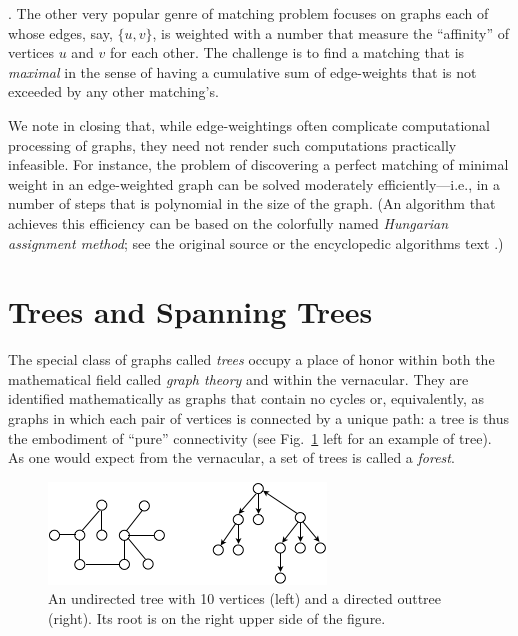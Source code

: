 \bigskip

.
The other very popular genre of matching problem focuses on graphs
each of whose edges, say, $\{u,v\}$, is weighted with a number that
measure the ``affinity'' of  vertices $u$ and $v$ for each other.  The
challenge is to find a matching that is {\em maximal}
 in the sense of having a cumulative
sum of edge-weights that is not exceeded by any other matching's.

We note in closing that, while edge-weightings often complicate
computational processing of graphs, they need not render such
computations practically infeasible.  For instance, the problem of
discovering a perfect matching of minimal weight in an edge-weighted
graph can be solved moderately efficiently---i.e., in a number of
steps that is polynomial in the size of the graph.  (An algorithm that
achieves this efficiency can be based on the colorfully named {\it
  Hungarian assignment method};   see the
original source \cite{Kuhn55} or the encyclopedic algorithms text
\cite{CLRS}.)



\section{Trees and Spanning Trees}
\label{sec:Trees}

The special class of graphs called {\it trees} occupy a place of honor within both the mathematical
field called {\it graph theory} and within the vernacular.  They are identified mathematically as graphs 
that contain no cycles or, equivalently, as graphs in which each pair of vertices is
connected by a unique path: a tree is thus the embodiment of ``pure''
connectivity (see Fig.~\ref{fig:tree} left for an example of tree).  As one
would expect from the vernacular, a set of trees is called a {\it forest}. 
\begin{figure}[hbt]
\begin{center}
       \includegraphics[scale=0.6]{FiguresGraph/tree}
       \caption{An undirected tree with 10 vertices (left) and a directed outtree (right).
       Its root is on the right upper side of the figure.}
  \label{fig:tree}
\end{center}
\end{figure}


